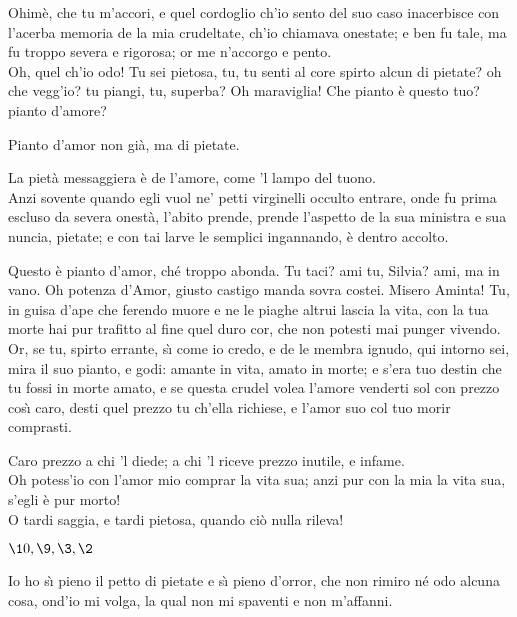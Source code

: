 \documentclass{book}
\begin{document}
	\3 Ohim\`e, che tu m'accori, e quel cordoglio
	ch'io sento del suo caso inacerbisce
	con l'acerba memoria
	de la mia crudeltate,
	ch'io chiamava onestate; e ben fu tale,
	ma fu troppo severa e rigorosa;
	or me n'accorgo e pento. \\

   \2 Oh, quel ch'io odo!
	Tu sei pietosa, tu, tu senti al core
	spirto alcun di pietate? oh che vegg'io?
	tu piangi, tu, superba? Oh maraviglia!
	Che pianto \`e questo tuo? pianto d'amore?

	\3 Pianto d'amor non gi\`a, ma di pietate.

	\2 La piet\`a messaggiera \`e de l'amore,
	come 'l lampo del tuono. \\

   \9 Anzi sovente
	quando egli vuol ne' petti virginelli
	occulto entrare, onde fu prima escluso
	da severa onest\`a, l'abito prende,
	prende l'aspetto de la sua ministra
	e sua nuncia, pietate; e con tai larve
	le semplici ingannando, \`e dentro accolto.

	\2 Questo \`e pianto d'amor, ch\'e troppo abonda.
	Tu taci? ami tu, Silvia? ami, ma in vano.
	Oh potenza d'Amor, giusto castigo
	manda sovra costei. Misero Aminta!
	Tu, in guisa d'ape che ferendo muore
	e ne le piaghe altrui lascia la vita,
	con la tua morte hai pur trafitto al fine
	quel duro cor, che non potesti mai
	punger vivendo. Or, se tu, spirto errante,
	s\`{\i} come io credo, e de le membra ignudo,
	qui intorno sei, mira il suo pianto, e godi:
	amante in vita, amato in morte; e s'era
	tuo destin che tu fossi in morte amato,
	e se questa crudel volea l'amore
	venderti sol con prezzo cos\`{\i} caro,
	desti quel prezzo tu ch'ella richiese,
	e l'amor suo col tuo morir comprasti.

	\9 Caro prezzo a chi 'l diede; a chi 'l riceve
	prezzo inutile, e infame. \\

   \3 Oh potess'io
	con l'amor mio comprar la vita sua;
	anzi pur con la mia la vita sua,
	s'egli \`e pur morto! \\

   \2 O tardi saggia, e tardi
	pietosa, quando ci\`o nulla rileva!


\Scena

\( \10, \9, \3, \2\)

	 Io ho s\`{\i} pieno il petto di pietate
	e s\`{\i} pieno d'orror, che non rimiro
	n\'e odo alcuna cosa, ond'io mi volga,
	la qual non mi spaventi e non m'affanni.
\end{document}
